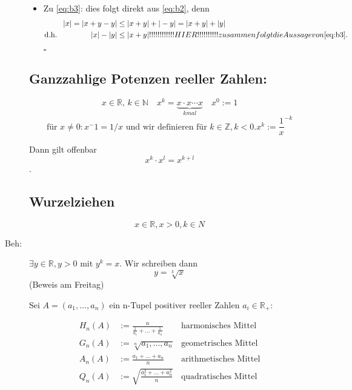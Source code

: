 \documentclass[12pt,a4paper,leqno]{article}
\begin{document}
\begin{description}
\begin{itemize}
\item[] Zu \eqref{eq:b3}: dies folgt direkt aus \eqref{eq:b2}, denn  
\begin{align*}
	|x| = |x+y-y| &\leq |x+y|+|-y| = |x + y| + |y| \\
\textrm{d.h. } \qquad \qquad |x|-|y| &\leq |x+y|

!!!!!!!!!!!!HIER!!!!!!!!!!

zusammen folgt die Aussage von \eqref{eq:b3}.

\end{align*}
	 \begin{flushright}$\square$\end{flushright}


\end{itemize}

\subsection*{Ganzzahlige Potenzen reeller Zahlen:}
$$x \in \mathbb{R} \textrm{, } k \in \mathbb{N} \quad x^k = \underbrace{x  \cdot  x  \cdots  x}_{k mal} \quad x^0 := 1$$
$$\textrm{für } x \neq 0 : x^-1 = 1 / x \textrm{ und wir definieren für } k \in \mathbb{Z}, k < 0. x ^{k} := \frac{1}{x} ^{-k}$$

Dann gilt offenbar $$x^k  \cdot  x ^l = x ^{k+l}$$.

\subsection*{Wurzelziehen}

$$x \in \mathbb{R}, x > 0, k \in N$$

\item[Beh:] $∃y \in \mathbb{R}, y > 0$ mit $y ^ k = x$. Wir schreiben dann $$y = \sqrt[k]{x}$$
(Beweis am Freitag)

\newpage

Sei $A=(a_1,\dotsc, a_n)$ ein n-Tupel positiver reeller Zahlen $a_i \in \mathbb{R}_+$:

\begin{align}
	H_n(A) &:= \frac{n}{\frac{1}{a_1} + ... + \frac{1}{a_n}} & \textrm{harmonisches Mittel} \\
	G_n(A) &:= \sqrt[n]{a_1,\dotsc, a_n} & \textrm{geometrisches Mittel}\\
	A_n(A) &:= \frac{a_1 + ... + a_n}{n}  & \textrm{arithmetisches Mittel}\\
	Q_n(A) &:= \sqrt{\frac{a_1^2 + ... + a_n^2}{n}} & \textrm{quadratisches  Mittel}
\end{align}
\end{description}
\end{document}
